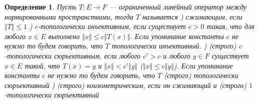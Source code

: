 \documentclass[12pt]{article}
\newtheorem{definition}[theorem]{Определение}
\begin{document}
\begin{definition}\label{DefNorOpType} Пусть $ T:E\to F$ --- ограниченный линейный оператор между нормированными пространствами, тогда $ T$ называется
) сжимающим, если $\Vert T\Vert\leq 1$
) \textit{$c$-топологически инъективным}, если существует $c > 0$ такая, что для любого $x \in E$ выполнено $\Vert x\Vert\leq c\Vert  T(x)\Vert$. Если упоминание константы $c$ не нужно то будем говорить, 
что $ T$ топологически инъективный.
) \textit{(строго) $c$-топологически сюрьективным}, если любого $c'>c$ и любого $y\in F$ существует $x \in E$ такой, что $ T(x) = y$ и $\Vert x \Vert < c' \Vert y \Vert$ ($\Vert x \Vert \leq c \Vert y \Vert$). 
Если упоминание константы $c$ не нужно то будем говорить, что $ T$ (строго) топологически сюръективный
) (строго) коизометрическим, если он сжимающий и (строго) $1$-топологически сюръективный
\end{definition}
\end{document}

